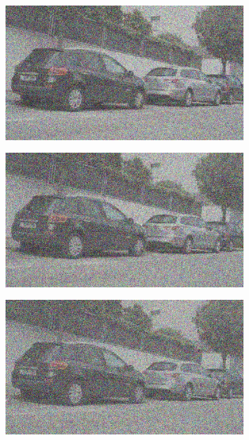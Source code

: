 \documentclass[a4paper]{ctexart}
\begin{document}
\begin{figure}[htbp]
\begin{subfigure}{0.08\textwidth}
				\label{fig：Gamma=0.9, Gauss Noise = 0.7}
			\end{subfigure}
			\begin{subfigure}{0.08\textwidth}
				\captionsetup{font=scriptsize}
				\includegraphics[width=\linewidth]{picture/Edge Detection/degrade/RGB_001 Gamma=0.9, Gauss Noise=0.8}
				\label{fig：Gamma=0.9, Gauss Noise = 0.8}
			\end{subfigure}
			\begin{subfigure}{0.08\textwidth}
				\captionsetup{font=scriptsize}
				\includegraphics[width=\linewidth]{picture/Edge Detection/degrade/RGB_001 Gamma=0.9, Gauss Noise=0.9}
				\label{fig：Gamma=0.9, Gauss Noise = 0.9}
			\end{subfigure}
			\begin{subfigure}{0.08\textwidth}
				\captionsetup{font=scriptsize}
				\includegraphics[width=\linewidth]{picture/Edge Detection/degrade/RGB_001 Gamma=0.9, Gauss Noise=1.0}

\end{subfigure}
\end{figure}
\end{document}
